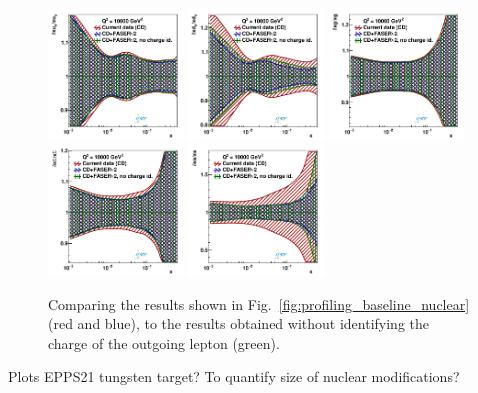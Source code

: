 \begin{figure}[t]
\centering
\includegraphics[width=0.32\textwidth]{plots/nuclear_fasernu2/nochargediscrimination/statOnly_FASERv2_q2_10000_pdf_uv_ratio.pdf}
\includegraphics[width=0.32\textwidth]{plots/nuclear_fasernu2/nochargediscrimination/statOnly_FASERv2_q2_10000_pdf_dv_ratio.pdf}
\includegraphics[width=0.32\textwidth]{plots/nuclear_fasernu2/nochargediscrimination/statOnly_FASERv2_q2_10000_pdf_g_ratio.pdf}\\
\includegraphics[width=0.32\textwidth]{plots/nuclear_fasernu2/nochargediscrimination/statOnly_FASERv2_q2_10000_pdf_Sea_ratio.pdf}
\includegraphics[width=0.32\textwidth]{plots/nuclear_fasernu2/nochargediscrimination/statOnly_FASERv2_q2_10000_pdf_s_ratio.pdf}
\caption{Comparing the results shown in Fig.~\ref{fig:profiling_baseline_nuclear} (red and blue), 
to the results obtained without identifying the charge of the outgoing lepton (green).
}
\label{fig:profiling_nochargediscrimination_nuclear}
\end{figure}


Plots EPPS21 tungsten target? To quantify size of nuclear modifications?
